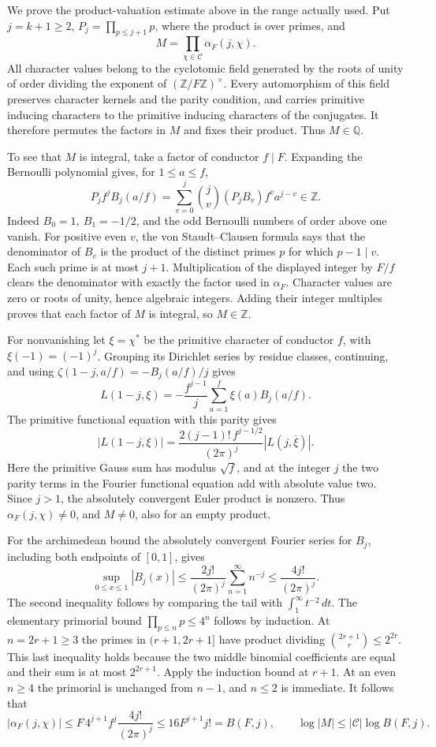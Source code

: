 We prove the product-valuation estimate above in the range actually
used. Put \(j=k+1\ge2\), \(P_j=\prod_{p\le j+1}p\), where the product
is over primes, and
\[
        M=\prod_{\chi\in\mathcal C}\alpha_F(j,\chi).
\]
All character values belong to the cyclotomic field generated by the
roots of unity of order dividing the exponent of
\((\mathbb Z/F\mathbb Z)^\times\). Every automorphism of this field
preserves character kernels and the parity condition, and carries
primitive inducing characters to the primitive inducing characters
of the conjugates. It therefore permutes the factors in \(M\) and
fixes their product. Thus \(M\in\mathbb Q\).

To see that \(M\) is integral, take a factor of conductor \(f\mid F\).
Expanding the Bernoulli polynomial gives, for \(1\le a\le f\),
\[
   P_j f^j B_j(a/f)=
       \sum_{v=0}^j {j\choose v}(P_j B_v)f^v a^{j-v}\in\mathbb Z.
\]
Indeed \(B_0=1,\ B_1=-1/2\), and the odd Bernoulli numbers of order
above one vanish. For positive even \(v\), the von Staudt--Clausen
formula says that the denominator of \(B_v\) is the product of
the distinct primes \(p\) for which \(p-1\mid v\). Each such prime
is at most \(j+1\). Multiplication of the displayed integer by
\(F/f\) clears the denominator with exactly the factor used in
\(\alpha_F\). Character values are zero or roots of unity, hence
algebraic integers. Adding their integer multiples proves that each
factor of \(M\) is integral, so \(M\in\mathbb Z\).

For nonvanishing let \(\xi=\chi^*\) be the primitive character of
conductor \(f\), with \(\xi(-1)=(-1)^j\). Grouping its Dirichlet
series by residue classes, continuing, and using
\(\zeta(1-j,a/f)=-B_j(a/f)/j\) gives
\[
    L(1-j,\xi)=-\frac {f^{j-1}}{j}
                         \sum_{a=1}^f \xi(a)B_j(a/f).
\]
The primitive functional equation with this parity gives
\[
    |L(1-j,\xi)|=
       \frac{2(j-1)!\,f^{j-1/2}}{(2\pi)^j}
                                  |L(j,\overline{\xi})|.
\]
Here the primitive Gauss sum has modulus \(\sqrt f\), and at the
integer \(j\) the two parity terms in the Fourier functional equation
add with absolute value two. Since \(j>1\), the absolutely convergent
Euler product is nonzero. Thus \(\alpha_F(j,\chi)\ne0\), and
\(M\ne0\), also for an empty product.

For the archimedean bound the absolutely convergent Fourier series
for \(B_j\), including both endpoints of \([0,1]\), gives
\[
 \sup_{0\le x\le1}|B_j(x)|\le
   \frac{2j!}{(2\pi)^j}\sum_{n=1}^\infty n^{-j}
   \le \frac{4j!}{(2\pi)^j}.
\]
The second inequality follows by comparing the tail with
\(\int_1^\infty t^{-2}\,dt\). The elementary primorial bound
\(\prod_{p\le n}p\le4^n\) follows by induction. At \(n=2r+1\ge3\)
the primes in \((r+1,2r+1]\) have product dividing
\({2r+1\choose r}\le2^{2r}\). This last inequality holds because
the two middle binomial coefficients are equal and their sum is at
most \(2^{2r+1}\). Apply the induction bound at \(r+1\). At an even
\(n\ge4\) the primorial is unchanged from \(n-1\), and \(n\le2\) is
immediate. It follows that
\[
 |\alpha_F(j,\chi)|\le F\,4^{j+1} f^j
                   \frac{4j!}{(2\pi)^j}
       \le 16 F^{j+1}j!=B(F,j),
 \qquad \log|M|\le|\mathcal C|\log B(F,j).
\]

